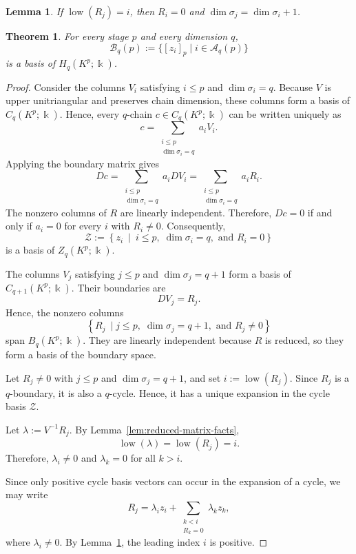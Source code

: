 \documentclass[10pt,a4paper]{amsart}
\newtheorem{lemma}{Lemma}
\newtheorem{theorem}{Theorem}
\begin{document}
\begin{lemma}
\label{lem:pivot-positive}
If $\operatorname{low}(R_j)=i$, then $R_i=0$ and $\dim\sigma_j=\dim\sigma_i+1$.
\end{lemma}

\begin{theorem}
\label{thm:active-basis}
For every stage $p$ and every dimension $q$,
\[
\mathcal B_q(p) := \{[z_i]_p\mid i\in\mathcal A_q(p)\}
\]
is a basis of $H_q(K^p;\Bbbk)$.
\end{theorem}

\begin{proof}
Consider the columns $V_i$ satisfying $i\leq p$ and $\dim\sigma_i=q$. Because $V$ is upper unitriangular and preserves chain dimension, these columns form a basis of $C_q(K^p;\Bbbk)$. Hence, every $q$-chain $c\in C_q(K^p;\Bbbk)$ can be written uniquely as
\[
c = \sum_{\substack{i\leq p\\ \dim\sigma_i=q}}a_iV_i.
\]
Applying the boundary matrix gives
\[
Dc = \sum_{\substack{i\leq p\\ \dim\sigma_i=q}}a_iDV_i = \sum_{\substack{i\leq p\\ \dim\sigma_i=q}} a_iR_i.
\]
The nonzero columns of $R$ are linearly independent. Therefore, $Dc=0$ if and only if $a_i=0$ for every $i$ with $R_i\neq 0$. Consequently,
\[
\mathcal{Z} := \left\{z_i\ \mid \ i \leq p,\;\dim\sigma_i=q, \text{ and }R_i=0\right\}
\]
is a basis of $Z_q(K^p;\Bbbk)$.

The columns $V_j$ satisfying $j\leq p$ and $\dim\sigma_j=q+1$ form a basis of $C_{q+1}(K^p;\Bbbk)$. Their boundaries are
\[
DV_j=R_j.
\]
Hence, the nonzero columns
\[
\left\{R_j\ \mid j\leq p,\;\dim\sigma_j=q+1,\text{ and } R_j\neq 0\right\}
\]
span $B_q(K^p;\Bbbk)$. They are linearly independent because $R$ is reduced, so they form a basis of the boundary space.

Let $R_j\neq 0$ with $j\leq p$ and $\dim\sigma_j=q+1$, and set $i:=\operatorname{low}(R_j)$. Since $R_j$ is a $q$-boundary, it is also a $q$-cycle. Hence, it has a unique expansion in the cycle basis $\mathcal{Z}$.

Let $\lambda:=V^{-1}R_j$. By Lemma~\ref{lem:reduced-matrix-facts},
\[
\operatorname{low}(\lambda) = \operatorname{low}(R_j) = i.
\]
Therefore, $\lambda_i\neq 0$ and $\lambda_k=0$ for all $k>i$.

Since only positive cycle basis vectors can occur in the expansion of a cycle, we may write
\[
R_j = \lambda_i z_i + \sum_{\substack{k<i\\ R_k=0}}\lambda_k z_k,
\]
where $\lambda_i\neq 0$. By Lemma~\ref{lem:pivot-positive}, the leading index $i$ is positive.


\end{proof}
\end{document}
